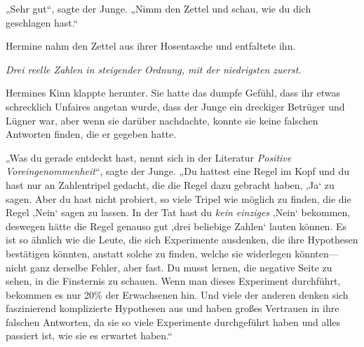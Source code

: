 „Sehr gut“, sagte der Junge. „Nimm den Zettel und schau, wie du dich geschlagen hast.“

Hermine nahm den Zettel aus ihrer Hosentasche und entfaltete ihn.

\emph{Drei reelle Zahlen in steigender Ordnung, mit der niedrigsten zuerst.}

Hermines Kinn klappte herunter. Sie hatte das dumpfe Gefühl, dass ihr etwas schrecklich Unfaires angetan wurde, dass der Junge ein dreckiger Betrüger und Lügner war, aber wenn sie darüber nachdachte, konnte sie keine falschen Antworten finden, die er gegeben hatte.

„Was du gerade entdeckt hast, nennt sich in der Literatur \emph{Positive Voreingenommenheit}“, sagte der Junge. „Du hattest eine Regel im Kopf und du hast nur an Zahlentripel gedacht, die die Regel dazu gebracht haben, ‚Ja‘ zu sagen. Aber du hast nicht probiert, so viele Tripel wie möglich zu finden, die die Regel ‚Nein‘ sagen zu lassen. In der Tat hast du \emph{kein einziges} ‚Nein‘ bekommen, deswegen hätte die Regel genauso gut ‚drei beliebige Zahlen‘ lauten können. Es ist so ähnlich wie die Leute, die sich Experimente ausdenken, die ihre Hypothesen bestätigen könnten, anstatt solche zu finden, welche sie widerlegen könnten—nicht ganz derselbe Fehler, aber fast. Du musst lernen, die negative Seite zu sehen, in die Finsternis zu schauen. Wenn man dieses Experiment durchführt, bekommen es nur 20\% der Erwachsenen hin. Und viele der anderen denken sich faszinierend komplizierte Hypothesen aus und haben großes Vertrauen in ihre falschen Antworten, da sie so viele Experimente durchgeführt haben und alles passiert ist, wie sie es erwartet haben.“

